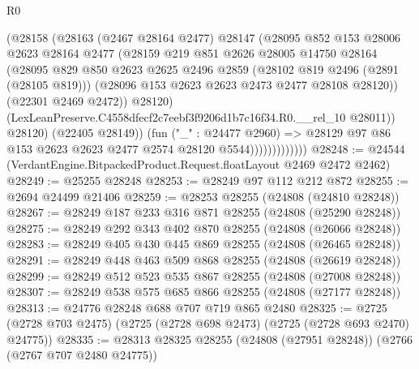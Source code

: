 \begin{lexlean}{R0}
\begin{coremodule}
                              (@28158
                                (@28163
                                  (@2467 @28164 @2477)
                                  @28147
                                  (@28095
                                    @852
                                    @153
                                    @28006
                                    @2623
                                    @28164
                                    @2477
                                    (@28159
                                      @219
                                      @851
                                      @2626
                                      @28005
                                      @14750
                                      @28164
                                      (@28095
                                        @829
                                        @850
                                        @2623
                                        @2625
                                        @2496
                                        @2859
                                        (@28102 @819 @2496 (@2891 (@28105 @819)))
                                        (@28096 @153 @2623 @2623 @2473 @2477 @28108 @28120))
                                      (@22301 @2469 @2472))
                                    @28120)
                                  (LexLeanPreserve.C4558dfecf2c7eebf3f9206d1b7c16f34.R0.__rel_10
                                    @28011))
                                @28120)
                              (@22405 @28149))
                            (fun ("_" : @24477 @2960) =>
                            @28129 @97 @86 @153 @2623 @2623 @2477 @2574 @28120 @5544)))))))))))))
@28248 := @24544 (VerdantEngine.BitpackedProduct.Request.floatLayout @2469 @2472 @2462)
@28249 := @25255 @28248
@28253 := @28249 @97 @112 @212 @872
@28255 := @2694 @24499 @21406
@28259 := @28253 @28255 (@24808 (@24810 @28248))
@28267 := @28249 @187 @233 @316 @871 @28255 (@24808 (@25290 @28248))
@28275 := @28249 @292 @343 @402 @870 @28255 (@24808 (@26066 @28248))
@28283 := @28249 @405 @430 @445 @869 @28255 (@24808 (@26465 @28248))
@28291 := @28249 @448 @463 @509 @868 @28255 (@24808 (@26619 @28248))
@28299 := @28249 @512 @523 @535 @867 @28255 (@24808 (@27008 @28248))
@28307 := @28249 @538 @575 @685 @866 @28255 (@24808 (@27177 @28248))
@28313 := @24776 @28248 @688 @707 @719 @865 @2480
@28325 := @2725 (@2728 @703 @2475) (@2725 (@2728 @698 @2473) (@2725 (@2728 @693 @2470) @24775))
@28335 := @28313 @28325 @28255 (@24808 (@27951 @28248)) (@2766 (@2767 @707 @2480 @24775))

\end{coremodule}
\end{lexlean}
